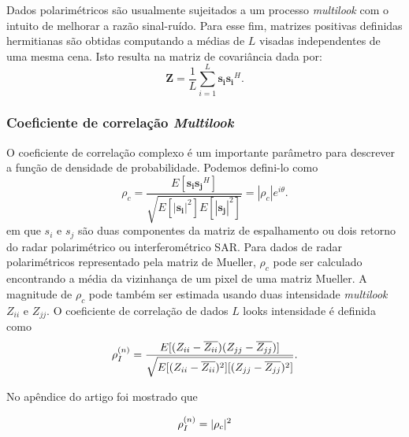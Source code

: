 Dados polarimétricos são usualmente sujeitados a um processo {\it multilook} com o intuito de melhorar a razão sinal-ruído.
Para esse fim, matrizes positivas definidas hermitianas são obtidas computando a médias de $L$ visadas 
independentes de uma mesma cena. Isto resulta na matriz de covariância {} dada por:
\begin{equation}\label{eqn7}
	\mathbf{Z}=\frac{1}{L}\sum_{i=1}^{L} \mathbf{s_is_i}^H .
\end{equation}

\subsubsection{Coeficiente de correlação {\it Multilook}}

O coeficiente de correlação complexo é um importante parâmetro para descrever a função de densidade de probabilidade. 
Podemos defini-lo como
\begin{equation}\label{eqn8}
	\rho_c=\frac{E[\mathbf{s_is_j}^H]}{\sqrt{E[|\mathbf{s_i}|^2]E[|\mathbf{s_j}|^2]}} =|\rho_c|e^{i\theta}.
\end{equation}
em que {\boldmath $s_i$} e {\boldmath $s_j$} 
são duas componentes da matriz de espalhamento ou dois retorno do radar polarimétrico ou interferométrico SAR. 
Para dados de radar polarimétricos representado pela matriz de Mueller, $\rho_c$ pode ser calculado encontrando a média da vizinhança de um pixel de uma matriz Mueller. A magnitude de $\rho_c$ pode também ser estimada usando duas intensidade  {\it multilook} $Z_{ii}$ e $Z_{jj}$. O coeficiente de correlação de dados $L$ looks intensidade é definida como   
\begin{equation}\label{eqn9}
	\rho_I^{(n)}=\frac{E[(Z_{ii}-\overline{Z_{ii}})(Z_{jj}-\overline{Z_{jj}})]}{\sqrt{E[(Z_{ii}-\overline{Z_{ii}})^2][(Z_{jj}-\overline{Z_{jj}})^2]}}. \\
\end{equation}

No apêndice do artigo \cite{lee} foi mostrado que 

\begin{equation}\label{eqn10}
	\rho_I^{(n)}= |\rho_c|^2\\
\end{equation}

